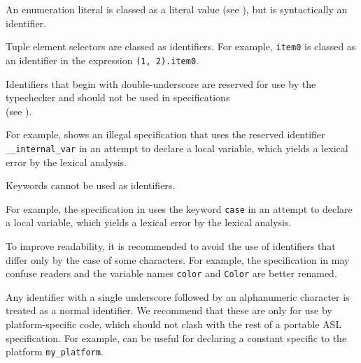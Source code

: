An enumeration literal is classed as a literal value
(see ), but is syntactically an identifier.

Tuple element selectors are classed as identifiers.
%
For example, \texttt{item0} is classed as an identifier
in the expression \verb|(1, 2).item0|.

Identifiers that begin with double-underscore are reserved for use
by the typechecker and should
not be used in specifications \\
(see ).

For example,  shows an illegal specification that uses the reserved
identifier \verb|__internal_var| in an attempt to declare a local variable,
which yields a lexical error by the lexical analysis.

Keywords cannot be used as identifiers.

For example, the specification in 
uses the keyword \verb|case| in an attempt to declare a local variable,
which yields a lexical error by the lexical analysis.

To improve readability, it is recommended to avoid the use of identifiers that differ
only by the case of some characters.
%
For example, the specification in 
may confuse readers and the variable names \verb|color| and \verb|Color| are better renamed.

Any identifier with a single underscore followed by an alphanumeric character
is treated as a normal identifier. We recommend that these are only
for use by platform-specific code, which should not clash with the rest of a
portable ASL specification.
%
For example, 
can be useful for declaring a constant specific to the platform \verb|my_platform|.

